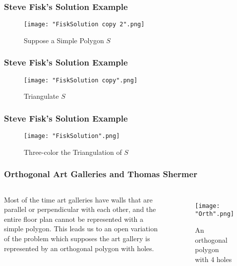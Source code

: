 \documentclass{beamer}
\begin{document}
\begin{frame}
\frametitle{Steve Fisk's Solution Example}
\begin{center}
	\begin{figure}[H]
		\caption{Suppose a Simple Polygon $S$}
		\centering
		\texttt{[image: "FiskSolution copy 2".png]}
		\end{figure}
\end{center}
\end{frame}

\begin{frame}
\frametitle{Steve Fisk's Solution Example}
\begin{center}
	\begin{figure}[H]
		\caption{Triangulate $S$}
		\centering
		\texttt{[image: "FiskSolution copy".png]}
		\end{figure}
\end{center}
\end{frame}

\begin{frame}
\frametitle{Steve Fisk's Solution Example}
\begin{center}
	\begin{figure}[H]
		\caption{Three-color the Triangulation of $S$}
		\centering
		\texttt{[image: "FiskSolution".png]}
		\end{figure}
\end{center}
\end{frame}


\begin{frame}
\frametitle{Orthogonal Art Galleries and Thomas Shermer}
\begin{columns}
Most of the time art galleries have walls that are parallel or perpendicular with each other, and the entire floor plan cannot be represented with a simple polygon. This leads us to an open variation of the problem which supposes the art gallery is represented by an orthogonal polygon with holes.
\begin{figure}[H]
		\centering
		\texttt{[image: "Orth".png]}
		\caption{An orthogonal polygon with 4 holes}
		\end{figure}

\end{columns}
\end{frame}
\end{document}
